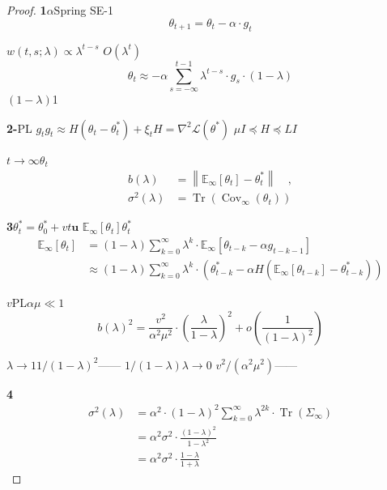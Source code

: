 \documentclass[11pt,a4paper]{article}
\theoremstyle{remark}
\DeclareMathOperator{\Cov}{Cov}
\DeclareMathOperator{\Tr}{Tr}
\newcommand{\E}{\mathbb{E}}
\newcommand{\norm}[1]{\left\lVert#1\right\rVert}
\begin{document}
\subsection{}

\begin{proof}
\textbf{1}$\alpha$Spring SE-1
\begin{equation}
    \theta_{t+1} = \theta_t - \alpha \cdot g_t
\end{equation}

$w(t, s; \lambda) \propto \lambda^{t-s}$
$O(\lambda^t)$
\begin{equation}
    \theta_t \approx -\alpha \sum_{s=-\infty}^{t-1} \lambda^{t-s} \cdot g_s \cdot (1-\lambda)
\end{equation}
$(1-\lambda)$1

\textbf{2-}PL
$g_t$$g_t \approx H(\theta_t - \theta_t^*) + \xi_t$$H = \nabla^2\mathcal{L}(\theta^*)$
$\mu I \preceq H \preceq L I$

$t \to \infty$$\theta_t$
\begin{align}
    b(\lambda) &= \norm{\E_\infty[\theta_t] - \theta_t^*} \quad\text{}, \\
    \sigma^2(\lambda) &= \Tr(\Cov_\infty(\theta_t))
\end{align}

\textbf{3}$\theta_t^* = \theta_0^* + v t \mathbf{u}$
$\E_\infty[\theta_t]$$\theta_t^*$
\begin{align}
    \E_\infty[\theta_t]
    &= (1-\lambda)\sum_{k=0}^{\infty} \lambda^k \cdot \E_\infty[\theta_{t-k} - \alpha g_{t-k-1}] \nonumber\\
    &\approx (1-\lambda)\sum_{k=0}^{\infty} \lambda^k \cdot (\theta_{t-k}^* - \alpha H(\E_\infty[\theta_{t-k}] - \theta_{t-k}^*))
\end{align}

$v$PL$\alpha \mu \ll 1$
\begin{equation}\label{eq:bias}
    b(\lambda)^2 = \frac{v^2}{\alpha^2\mu^2} \cdot \left(\frac{\lambda}{1-\lambda}\right)^2 + o\left(\frac{1}{(1-\lambda)^2}\right)
\end{equation}

\textbf{}$\lambda \to 1$$1/(1-\lambda)^2$——
$1/(1-\lambda)$$\lambda \to 0$
$v^2/(\alpha^2\mu^2)$——

\textbf{4}
\begin{align}
    \sigma^2(\lambda) &= \alpha^2 \cdot (1-\lambda)^2 \sum_{k=0}^{\infty} \lambda^{2k} \cdot \Tr(\Sigma_\infty) \nonumber\\
    &= \alpha^2 \sigma^2 \cdot \frac{(1-\lambda)^2}{1-\lambda^2} \nonumber\\
    &= \alpha^2 \sigma^2 \cdot \frac{1-\lambda}{1+\lambda}
\end{align}


\end{proof}
\end{document}
